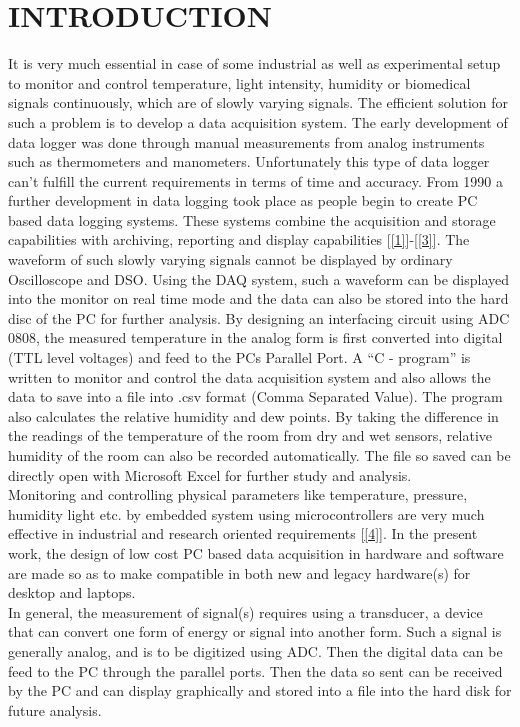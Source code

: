 \documentclass[10pt,a4paper]{article}
\begin{document}
\section{INTRODUCTION}
It is very much essential in case of some industrial as well as experimental setup to monitor and control temperature, light intensity, humidity or biomedical signals continuously, which are of slowly varying signals. The efficient solution for such a problem is to develop a data acquisition system. The early development of data logger was done through manual measurements from analog instruments such as thermometers and manometers. Unfortunately this type of data logger can’t fulfill the current requirements in terms of time and accuracy. From 1990 a further development in data logging took place as people begin to create PC based data logging systems. These systems combine the acquisition and storage capabilities with archiving, reporting and display capabilities [\ref{1}]-[\ref{3}]. The waveform of such slowly varying signals cannot be displayed by ordinary Oscilloscope and DSO. Using the DAQ system, such a waveform can be displayed into the monitor on real time mode and the data can also be stored into the hard disc of the PC for further analysis. By designing an interfacing circuit using ADC 0808, the measured temperature in the analog form is first converted into digital (TTL level voltages) and feed to the PCs Parallel Port. A ``C - program'' is written to monitor and control the data acquisition system and also allows the data to save into a file into .csv format (Comma Separated Value). The program also calculates the relative humidity and dew points. By taking the difference in the readings of the temperature of the room from dry and wet sensors, relative humidity of the room can also be recorded automatically. The file so saved can be directly open with Microsoft Excel for further study and analysis.\\

Monitoring and controlling physical parameters like temperature, pressure, humidity light etc. by embedded system using microcontrollers are very much effective in industrial and research oriented requirements [\ref{4}]. In the present work, the design of low cost PC based data acquisition in hardware and software are made so as to make compatible in both new and legacy hardware(s) for desktop and laptops.\\

In general, the measurement of signal(s) requires using a transducer, a device that can convert one form of energy or signal into another form. Such a signal is generally analog, and is to be digitized using ADC. Then the digital data can be feed to the PC through the parallel ports. Then the data so sent can be received by the PC and can display graphically and stored into a file into the hard disk for future analysis.
 
\end{document}
